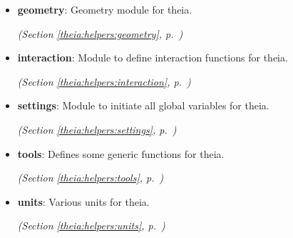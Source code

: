 \begin{itemize}
\setlength{\parskip}{0ex}
\item \textbf{geometry}: Geometry module for theia.



  \textit{(Section \ref{theia:helpers:geometry}, p.~\pageref{theia:helpers:geometry})}

\item \textbf{interaction}: Module to define interaction functions for theia.



  \textit{(Section \ref{theia:helpers:interaction}, p.~\pageref{theia:helpers:interaction})}

\item \textbf{settings}: Module to initiate all global variables for theia.



  \textit{(Section \ref{theia:helpers:settings}, p.~\pageref{theia:helpers:settings})}

\item \textbf{tools}: Defines some generic functions for theia.



  \textit{(Section \ref{theia:helpers:tools}, p.~\pageref{theia:helpers:tools})}

\item \textbf{units}: Various units for theia.



  \textit{(Section \ref{theia:helpers:units}, p.~\pageref{theia:helpers:units})}

\end{itemize}

